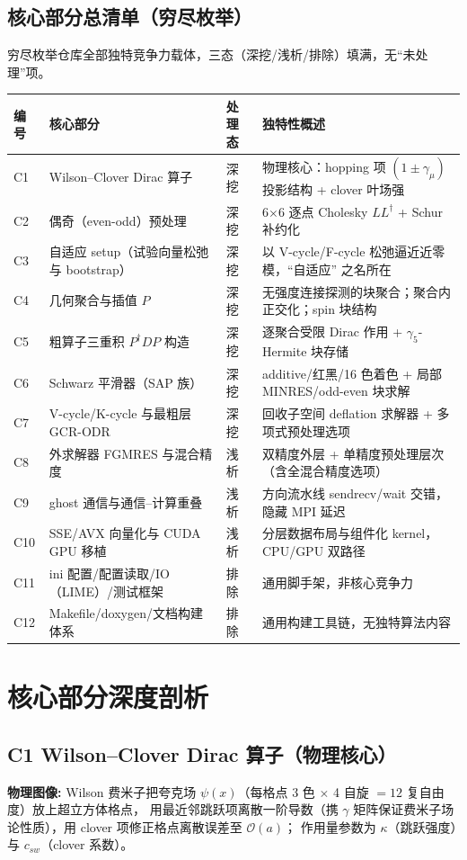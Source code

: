 \documentclass[UTF8]{ctexart}
\begin{document}
\subsection{核心部分总清单（穷尽枚举）}
穷尽枚举仓库全部独特竞争力载体，三态（深挖/浅析/排除）填满，无``未处理''项。
\begin{xltabular}{\textwidth}{lllX}
\toprule
\textcolor{algo}{编号} & 核心部分 & 处理态 & 独特性概述 \\
\midrule
\endhead
C1 & Wilson--Clover Dirac 算子 & 深挖 & 物理核心：hopping 项 $(1\pm\gamma_\mu)$ 投影结构 + clover 叶场强 \\
C2 & 偶奇（even-odd）预处理 & 深挖 & 6$\times$6 逐点 Cholesky $LL^\dagger$ + Schur 补约化 \\
C3 & 自适应 setup（试验向量松弛与 bootstrap） & 深挖 & 以 V-cycle/F-cycle 松弛逼近近零模，``自适应'' 之名所在 \\
C4 & 几何聚合与插值 $P$ & 深挖 & 无强度连接探测的块聚合；聚合内正交化；spin 块结构 \\
C5 & 粗算子三重积 $P^\dagger D P$ 构造 & 深挖 & 逐聚合受限 Dirac 作用 + $\gamma_5$-Hermite 块存储 \\
C6 & Schwarz 平滑器（SAP 族） & 深挖 & additive/红黑/16 色着色 + 局部 MINRES/odd-even 块求解 \\
C7 & V-cycle/K-cycle 与最粗层 GCR-ODR & 深挖 & 回收子空间 deflation 求解器 + 多项式预处理选项 \\
C8 & 外求解器 FGMRES 与混合精度 & 浅析 & 双精度外层 + 单精度预处理层次（含全混合精度选项） \\
C9 & ghost 通信与通信--计算重叠 & 浅析 & 方向流水线 sendrecv/wait 交错，隐藏 MPI 延迟 \\
C10 & SSE/AVX 向量化与 CUDA GPU 移植 & 浅析 & 分层数据布局与组件化 kernel，CPU/GPU 双路径 \\
C11 & ini 配置/配置读取/IO（LIME）/测试框架 & 排除 & 通用脚手架，非核心竞争力 \\
C12 & Makefile/doxygen/文档构建体系 & 排除 & 通用构建工具链，无独特算法内容 \\
\bottomrule
\end{xltabular}

\section{核心部分深度剖析}

\subsection{C1 Wilson--Clover Dirac 算子（物理核心）}
\begin{physbox}
\textbf{物理图像:} Wilson 费米子把夸克场 $\psi(x)$（每格点 3 色 $\times$ 4 自旋 $=12$ 复自由度）放上超立方体格点，
用最近邻跳跃项离散一阶导数（携 $\gamma$ 矩阵保证费米子场论性质），用 clover 项修正格点离散误差至 $\mathcal{O}(a)$；
作用量参数为 $\kappa$（跳跃强度）与 $c_{sw}$（clover 系数）。
\end{physbox}
\end{document}
